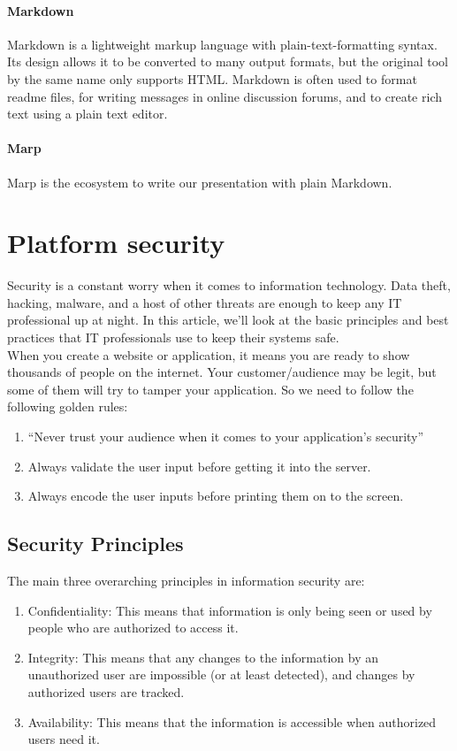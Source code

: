 \paragraph*{Markdown}
Markdown is a lightweight markup language with plain-text-formatting syntax. Its design allows it to be converted to many output formats, but the original tool by the same name only supports HTML. Markdown is often used to format readme files, for writing messages in online discussion forums, and to create rich text using a plain text editor.
\paragraph*{Marp}
Marp is the ecosystem to write our presentation with plain Markdown.


\section{Platform security}
Security is a constant worry when it comes to information technology. Data theft, hacking, malware, and a host of other threats are enough to keep any IT professional up at night. In this article, we’ll look at the basic principles and best practices that IT professionals use to keep their systems safe.
\\
When you create a website or application, it means you are ready to show thousands of people on the internet. Your customer/audience may be legit, but some of them will try to tamper your application. So we need to follow the following golden rules:
\begin{enumerate}
      \item 
      “Never trust your audience when it comes to your application’s security”
      \item 
      Always validate the user input before getting it into the server.
      \item 
      Always encode the user inputs before printing them on to the screen.
\end{enumerate}

\subsection{Security Principles}
The main three overarching principles in information security are:
\begin{enumerate}
      \item 
      Confidentiality: This means that information is only being seen or used by people who are authorized to access it.
      \item 
      Integrity: This means that any changes to the information by an unauthorized user are impossible (or at least detected), and changes by authorized users are tracked.
      \item 
      Availability: This means that the information is accessible when authorized users need it.
\end{enumerate}

